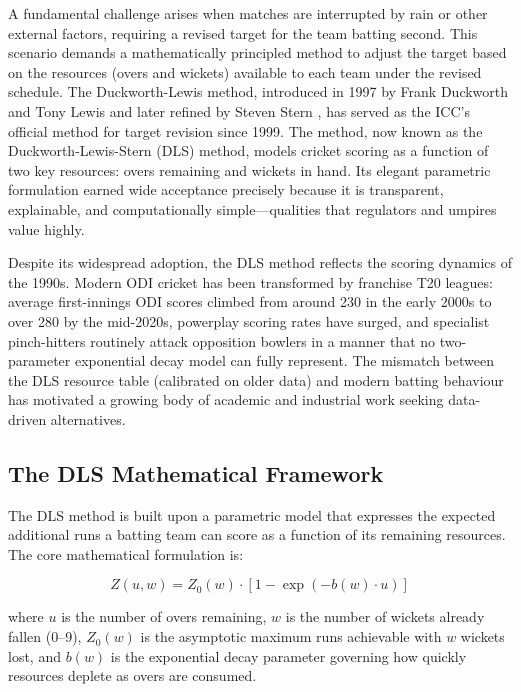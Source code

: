 \documentclass[10pt,a4paper,twocolumn]{article}
\begin{document}
A fundamental challenge arises when matches are interrupted by rain or other external factors, requiring a revised target for the team batting second. This scenario demands a mathematically principled method to adjust the target based on the resources (overs and wickets) available to each team under the revised schedule. The Duckworth-Lewis method, introduced in 1997 by Frank Duckworth and Tony Lewis \citep{duckworth1998} and later refined by Steven Stern \citep{stern2016}, has served as the ICC's official method for target revision since 1999. The method, now known as the Duckworth-Lewis-Stern (DLS) method, models cricket scoring as a function of two key resources: overs remaining and wickets in hand. Its elegant parametric formulation earned wide acceptance precisely because it is transparent, explainable, and computationally simple---qualities that regulators and umpires value highly.

Despite its widespread adoption, the DLS method reflects the scoring dynamics of the 1990s. Modern ODI cricket has been transformed by franchise T20 leagues: average first-innings ODI scores climbed from around 230 in the early 2000s to over 280 by the mid-2020s, powerplay scoring rates have surged, and specialist pinch-hitters routinely attack opposition bowlers in a manner that no two-parameter exponential decay model can fully represent. The mismatch between the DLS resource table (calibrated on older data) and modern batting behaviour has motivated a growing body of academic and industrial work seeking data-driven alternatives.

\subsection{The DLS Mathematical Framework}

The DLS method is built upon a parametric model that expresses the expected additional runs a batting team can score as a function of its remaining resources. The core mathematical formulation is:

\begin{equation}
Z(u, w) = Z_0(w) \cdot \left[1 - \exp\left(-b(w) \cdot u\right)\right]
\label{eq:dls}
\end{equation}

\noindent where $u$ is the number of overs remaining, $w$ is the number of wickets already fallen (0--9), $Z_0(w)$ is the asymptotic maximum runs achievable with $w$ wickets lost, and $b(w)$ is the exponential decay parameter governing how quickly resources deplete as overs are consumed.
\end{document}
